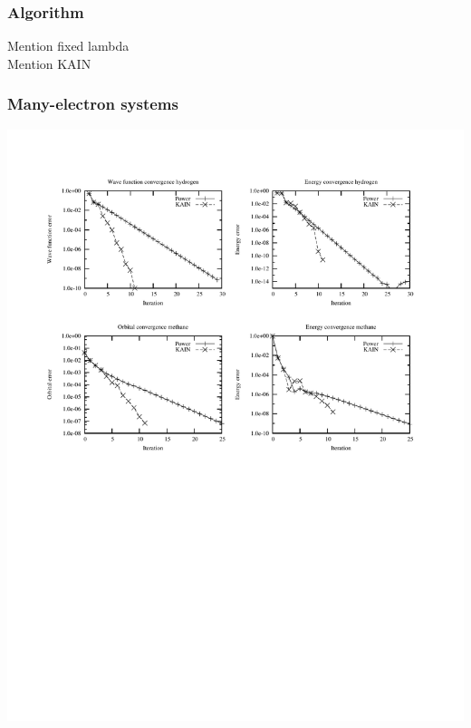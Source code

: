 \documentclass[mathserif]{beamer}
\begin{document}
\begin{frame}
    \frametitle{Algorithm}
    Mention fixed lambda\\
    Mention KAIN
\end{frame}

\begin{frame}
    \frametitle{Many-electron systems}
    \begin{center}
	\includegraphics[scale=0.6, clip, viewport = 50 350 540 530]{figures/convergence.pdf}
    \end{center}
\end{frame}
\end{document}
